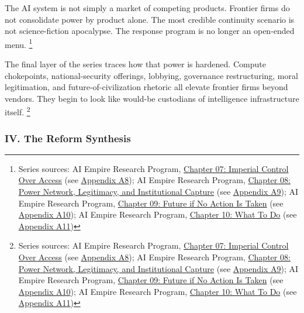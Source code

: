 \documentclass[
  american,
  11pt,
  letterpaper,
]{article}
\begin{document}
The AI system is not simply a market of competing products. Frontier
firms do not consolidate power by product alone. The most credible
continuity scenario is not science-fiction apocalypse. The response
program is no longer an open-ended menu. \footnote{Series sources: AI
  Empire Research Program,
  \href{07_imperial-control-over-access_paper.html}{Chapter 07: Imperial
  Control Over Access} (see
  \hyperref[appendix-a8-chapter-07-imperial-control-over-access]{Appendix
  A8}); AI Empire Research Program,
  \href{08_legitimacy-and-institutional-capture_paper.html}{Chapter 08:
  Power Network, Legitimacy, and Institutional Capture} (see
  \hyperref[appendix-a9-chapter-08-power-network-legitimacy-and-institutional-capture]{Appendix
  A9}); AI Empire Research Program,
  \href{09_future-if-unchecked_paper.html}{Chapter 09: Future if No
  Action Is Taken} (see
  \hyperref[appendix-a10-chapter-09-future-if-no-action-is-taken]{Appendix
  A10}); AI Empire Research Program,
  \href{10_three-reform-program_paper.html}{Chapter 10: What To Do} (see
  \hyperref[appendix-a11-chapter-10-what-to-do]{Appendix A11})}

The final layer of the series traces how that power is hardened. Compute
chokepoints, national-security offerings, lobbying, governance
restructuring, moral legitimation, and future-of-civilization rhetoric
all elevate frontier firms beyond vendors. They begin to look like
would-be custodians of intelligence infrastructure itself. \footnote{Series
  sources: AI Empire Research Program,
  \href{07_imperial-control-over-access_paper.html}{Chapter 07: Imperial
  Control Over Access} (see
  \hyperref[appendix-a8-chapter-07-imperial-control-over-access]{Appendix
  A8}); AI Empire Research Program,
  \href{08_legitimacy-and-institutional-capture_paper.html}{Chapter 08:
  Power Network, Legitimacy, and Institutional Capture} (see
  \hyperref[appendix-a9-chapter-08-power-network-legitimacy-and-institutional-capture]{Appendix
  A9}); AI Empire Research Program,
  \href{09_future-if-unchecked_paper.html}{Chapter 09: Future if No
  Action Is Taken} (see
  \hyperref[appendix-a10-chapter-09-future-if-no-action-is-taken]{Appendix
  A10}); AI Empire Research Program,
  \href{10_three-reform-program_paper.html}{Chapter 10: What To Do} (see
  \hyperref[appendix-a11-chapter-10-what-to-do]{Appendix A11})}

\subsubsection{IV. The Reform Synthesis}\label{iv.-the-reform-synthesis}
\end{document}

